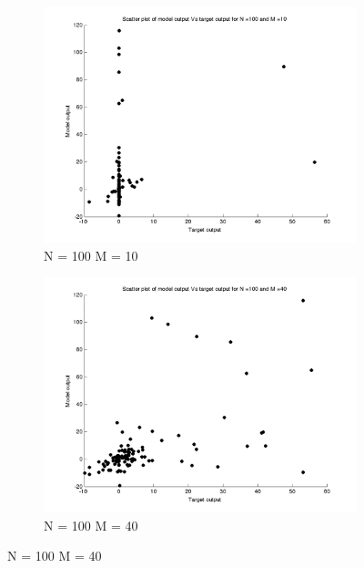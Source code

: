 \documentclass{article}
\begin{document}
\begin{figure}[H]

\begin{subfigure}{.5\textwidth}
\centering
\includegraphics[width=\linewidth]{D2/Scatter/VaryingM_N100M10}
\caption{N = 100 M = 10}
\end{subfigure}
\begin{subfigure}{.5\textwidth}
\includegraphics[width=\linewidth]{D2/Scatter/VaryingM_N100M40}
\caption{N = 100 M = 40}
\end{subfigure}



\end{figure}
\end{document}
